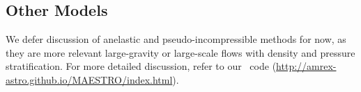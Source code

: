 \subsection{Other Models}
We defer discussion of anelastic and pseudo-incompressible methods for now,
as they are more relevant large-gravity or large-scale flows with 
density and pressure stratification.  For more detailed discussion,
refer to our \maestro\ code
(\url{http://amrex-astro.github.io/MAESTRO/index.html}).






